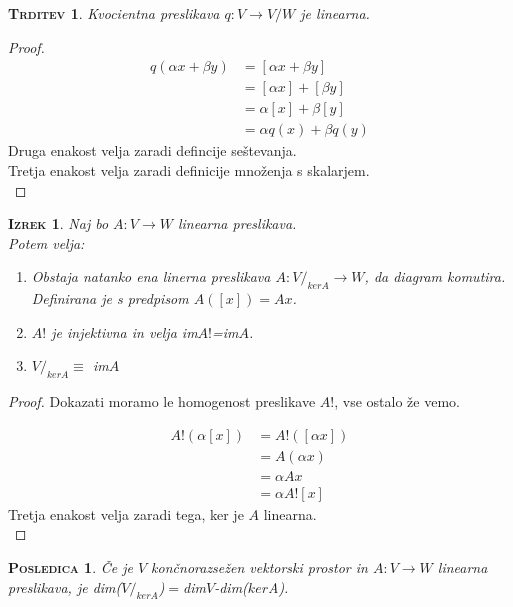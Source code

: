 \documentclass[a4paper,12pt]{article}
\newtheorem*{trditev}{\textsc{Trditev}}
\newtheorem*{izrek}{\textsc{Izrek}}
\newtheorem*{posledica}{\textsc{Posledica}}
\begin{document}
\begin{trditev}
	Kvocientna preslikava $q:V\to V/W$ je linearna.\\
\end{trditev}

\begin{proof}
	\begin{align*}
		q(\alpha x + \beta y) &= [\alpha x + \beta y] \\
		&=[\alpha x]+[\beta y] \\
		&= \alpha[x]+\beta[y] \\
		&= \alpha q (x)+\beta q (y)
	\end{align*}
Druga enakost velja zaradi defincije seštevanja. \\
Tretja enakost velja zaradi definicije množenja s skalarjem.\\
\end{proof}

\newpage 

\begin{izrek}
	Naj bo $A:V\to W$ linearna preslikava. \\ 

	Potem velja:
	\begin{enumerate}
		\item Obstaja natanko ena linerna preslikava $A: V/_{kerA} \to W$, da diagram komutira. Definirana je s predpisom $A([x])=Ax$.
		\item $A!$ je injektivna in velja im$A!$=im$A$.
		\item $V/_{kerA}\equiv$ im$A$\\
		\end{enumerate}
\end{izrek}

\begin{proof}
	Dokazati moramo le homogenost preslikave $A!$, vse ostalo že vemo.

	\begin{align*}
		A!(\alpha[x])&=A!([\alpha x]) \\
		&= A(\alpha x) \\
		&= \alpha A x \\
		&= \alpha A! [x]
	\end{align*}
	Tretja enakost velja zaradi tega, ker je $A$ linearna. \\
\end{proof}

\begin{posledica}
	Če je $V$ končnorazsežen vektorski prostor in $A:V\to W$ linearna preslikava, je dim($V/_{kerA}$)$=$dim$V$-dim($ker$A).\\
\end{posledica}
\end{document}
